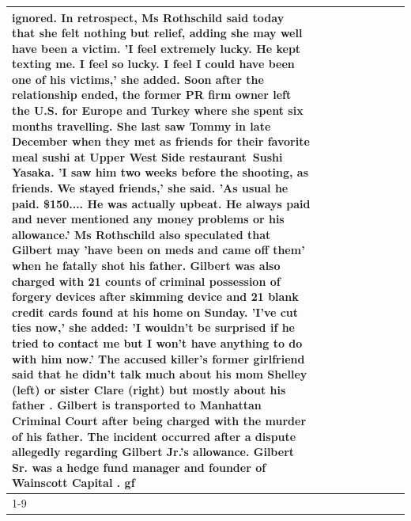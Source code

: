 \begin{table}[H]
\begin{tabular}{lllrlllll}
ignored. In retrospect, Ms Rothschild said today that she felt nothing but relief, adding she may well have been a victim. 'I feel extremely lucky. He kept texting me. I feel so lucky. I feel I could have been one of his victims,' she added. Soon after the relationship ended, the former PR firm owner left the U.S. for Europe and Turkey where she spent six months  travelling. She last saw Tommy in late December when they met as friends for their favorite meal sushi at Upper West Side restaurant Sushi Yasaka. 'I saw him two weeks before the shooting, as friends. We stayed friends,' she said. 'As usual he paid. \$150.... He was actually upbeat. He always paid and never mentioned any money problems or his allowance.' Ms Rothschild also speculated that Gilbert may 'have been on meds and came off them' when he fatally shot his father. Gilbert was also charged with 21 counts of criminal possession of forgery devices after skimming device and 21 blank credit cards found at his home on Sunday. 'I've cut ties now,' she added: 'I wouldn’t be surprised if he tried to contact me but I won’t have anything to do with him now.' The accused killer's former girlfriend said that he didn't talk much about his mom Shelley (left) or sister Clare (right) but mostly about his father . Gilbert is transported to Manhattan Criminal Court  after being charged with the murder of his father. The incident occurred after a dispute allegedly regarding Gilbert Jr.'s allowance. Gilbert Sr. was a hedge fund manager and founder of Wainscott Capital . gf \\
\cline{1-9}

\end{tabular}
\end{table}
